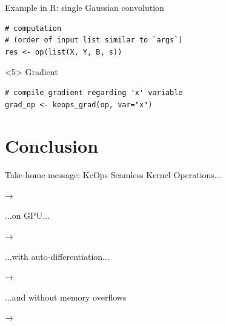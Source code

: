 \documentclass[14pt]{beamer}
\begin{document}
\begin{frame}[fragile]{Example in R: single Gaussian convolution}
\begin{onlyenv}
\begin{verbatim}
# computation
# (order of input list similar to `args`)
res <- op(list(X, Y, B, s))
\end{verbatim}
\end{onlyenv}

\begin{onlyenv}<5>
Gradient
\begin{verbatim}
# compile gradient regarding 'x' variable
grad_op <- keops_grad(op, var="x")
\end{verbatim}
\end{onlyenv}

\end{frame}

\section{Conclusion}


\begin{frame}{Take-home message: KeOps}
\small
Seamless Kernel Operations...\medskip

\hspace{0.5cm} $\rightarrow$ \medskip

...on GPU...\medskip

\hspace{0.5cm} $\rightarrow$ \medskip

...with auto-differentiation...\medskip

\hspace{0.5cm} $\rightarrow$ \medskip

...and without memory overflows\medskip

\hspace{0.5cm} $\rightarrow$ 
\end{frame}
\end{document}
